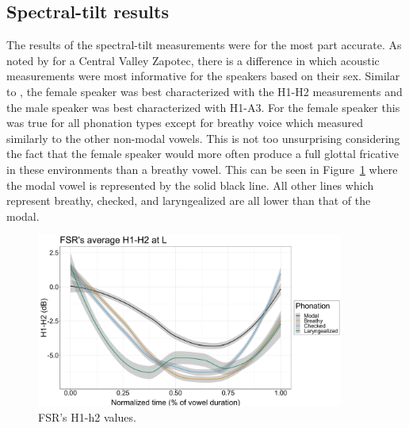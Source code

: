 \documentclass[12pt, letterpaper]{article}
\begin{document}
\subsection{Spectral-tilt results} \label{sec:Results}

The results of the spectral-tilt measurements were for the most part accurate. As noted by \citet{espositoVariationContrastivePhonation2010} for a Central Valley Zapotec, there is a difference in which acoustic measurements were most informative for the speakers based on their sex. Similar to \citeauthor{espositoVariationContrastivePhonation2010}, the female speaker was best characterized with the H1-H2 measurements and the male speaker was best characterized with H1-A3. For the female speaker this was true for all phonation types except for breathy voice which measured similarly to the other non-modal vowels. This is not too unsurprising considering the fact that the female speaker would more often produce a full glottal fricative in these environments than a breathy vowel. This can be seen in Figure~\ref{fig:FSRh1h2} where the modal vowel is represented by the solid black line. All other lines which represent breathy, checked, and laryngealized are all lower than that of the modal. 
\begin{figure}[!ht]
	\includegraphics[width=0.9\textwidth]{../h1h2_line_L.png}
	\caption{FSR's H1-h2 values.}
	\label{fig:FSRh1h2} 
\end{figure}
\end{document}
